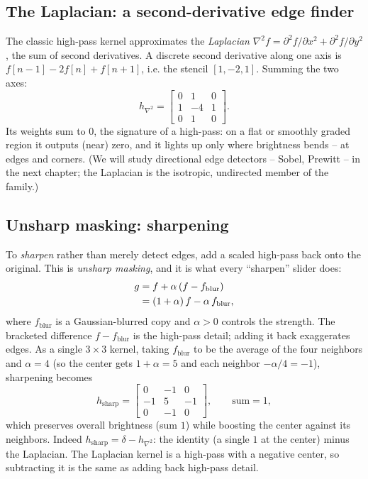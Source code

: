 \subsection{The Laplacian: a second-derivative edge finder}
The classic high-pass kernel approximates the \emph{Laplacian}
$\nabla^2 f = \partial^2 f/\partial x^2 + \partial^2 f/\partial y^2$, the sum of
second derivatives. A discrete second derivative along one axis is
$f[n-1] - 2f[n] + f[n+1]$, i.e. the stencil $[1,-2,1]$. Summing the two axes:
\[
h_{\nabla^2} = \begin{bmatrix} 0 & 1 & 0\\ 1 & -4 & 1\\ 0 & 1 & 0\end{bmatrix}.
\]
Its weights sum to $0$, the signature of a high-pass: on a flat or smoothly graded
region it outputs (near) zero, and it lights up only where brightness bends -- at
edges and corners. (We will study directional edge detectors -- Sobel, Prewitt --
in the next chapter; the Laplacian is the isotropic, undirected member of the
family.)

\subsection{Unsharp masking: sharpening}
To \emph{sharpen} rather than merely detect edges, add a scaled high-pass back onto
the original. This is \emph{unsharp masking}, and it is what every ``sharpen''
slider does:
\begin{align}
g &= f + \alpha\,(f - f_{\text{blur}}) \notag \\
&= (1+\alpha)\,f - \alpha\, f_{\text{blur}},
\label{ch31:unsharp}
\end{align}
where $f_{\text{blur}}$ is a Gaussian-blurred copy and $\alpha>0$ controls the
strength. The bracketed difference $f - f_{\text{blur}}$ is the high-pass detail;
adding it back exaggerates edges. As a single $3\times3$ kernel, taking
$f_{\text{blur}}$ to be the average of the four neighbors and $\alpha = 4$ (so the
center gets $1+\alpha = 5$ and each neighbor $-\alpha/4 = -1$), sharpening becomes
\[
h_{\text{sharp}} = \begin{bmatrix} 0 & -1 & 0\\ -1 & 5 & -1\\ 0 & -1 & 0\end{bmatrix},
\qquad\text{sum} = 1,
\]
which preserves overall brightness (sum $1$) while boosting the center against its
neighbors. Indeed $h_{\text{sharp}} = \delta - h_{\nabla^2}$: the identity (a
single $1$ at the center) minus the Laplacian. The Laplacian kernel is a
high-pass with a negative center, so subtracting it is the same as adding back
high-pass detail.

